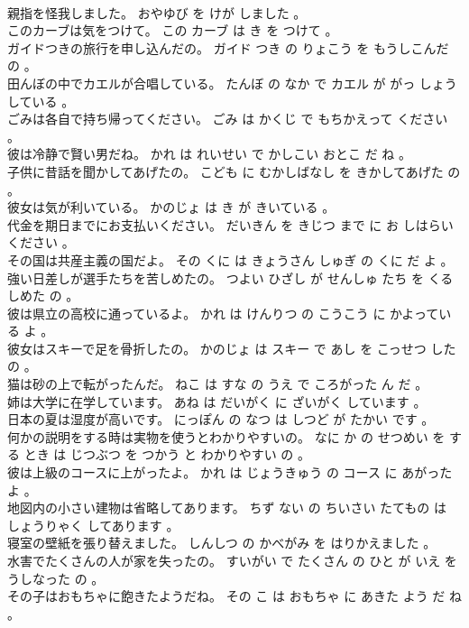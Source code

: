 \documentclass[8pt]{extreport}
\begin{document}
\begin{CJK}{UTF8}{min}
\\	親指を怪我しました。	おやゆび を けが しました 。 
\\	このカーブは気をつけて。	この カーブ は き を つけて 。 
\\	ガイドつきの旅行を申し込んだの。	ガイド つき の りょこう を もうしこんだ の 。 
\\	田んぼの中でカエルが合唱している。	たんぼ の なか で カエル が がっ しょう している 。 
\\	ごみは各自で持ち帰ってください。	ごみ は かくじ で もちかえって ください 。 
\\	彼は冷静で賢い男だね。	かれ は れいせい で かしこい おとこ だ ね 。 
\\	子供に昔話を聞かしてあげたの。	こども に むかしばなし を きかしてあげた の 。 
\\	彼女は気が利いている。	かのじょ は き が きいている 。 
\\	代金を期日までにお支払いください。	だいきん を きじつ まで に お しはらい ください 。 
\\	その国は共産主義の国だよ。	その くに は きょうさん しゅぎ の くに だ よ 。 
\\	強い日差しが選手たちを苦しめたの。	つよい ひざし が せんしゅ たち を くるしめた の 。 
\\	彼は県立の高校に通っているよ。	かれ は けんりつ の こうこう に かよっている よ 。 
\\	彼女はスキーで足を骨折したの。	かのじょ は スキー で あし を こっせつ した の 。 
\\	猫は砂の上で転がったんだ。	ねこ は すな の うえ で ころがった ん だ 。 
\\	姉は大学に在学しています。	あね は だいがく に ざいがく しています 。 
\\	日本の夏は湿度が高いです。	にっぽん の なつ は しつど が たかい です 。 
\\	何かの説明をする時は実物を使うとわかりやすいの。	なに か の せつめい を する とき は じつぶつ を つかう と わかりやすい の 。 
\\	彼は上級のコースに上がったよ。	かれ は じょうきゅう の コース に あがった よ 。 
\\	地図内の小さい建物は省略してあります。	ちず ない の ちいさい たてもの は しょうりゃく してあります 。 
\\	寝室の壁紙を張り替えました。	しんしつ の かべがみ を はりかえました 。 
\\	水害でたくさんの人が家を失ったの。	すいがい で たくさん の ひと が いえ を うしなった の 。 
\\	その子はおもちゃに飽きたようだね。	その こ は おもちゃ に あきた よう だ ね 。 

\end{CJK}
\end{document}
